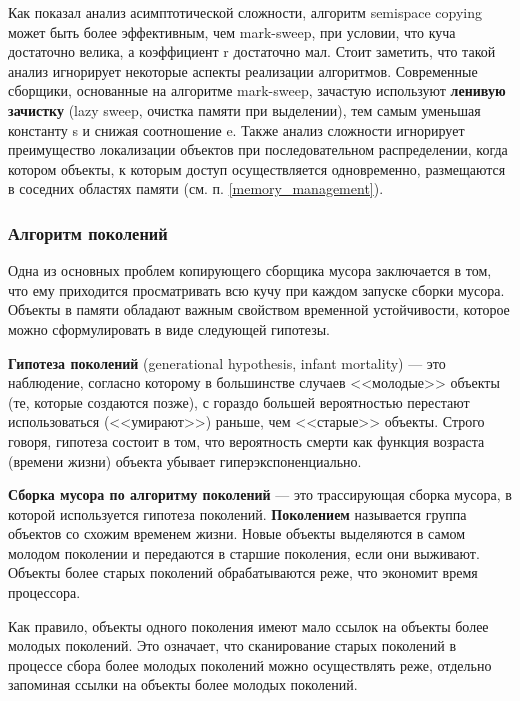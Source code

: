 Как показал анализ асимптотической сложности, алгоритм semispace copying может быть более эффективным, чем mark-sweep, при условии, что куча достаточно велика, а коэффициент r достаточно мал. Стоит заметить, что такой анализ игнорирует некоторые аспекты реализации алгоритмов. Современные сборщики, основанные на алгоритме mark-sweep, зачастую используют \textbf{ленивую зачистку} (lazy sweep, очистка памяти при выделении), тем самым уменьшая константу s и снижая соотношение e. Также анализ сложности игнорирует преимущество локализации объектов при последовательном распределении, когда котором объекты, к которым доступ осуществляется одновременно, размещаются в соседних областях памяти (см. п. \ref{memory_management}).



\subsubsection{Алгоритм поколений}

Одна из основных проблем копирующего сборщика мусора заключается в том, что ему приходится просматривать всю кучу при каждом запуске сборки мусора. Объекты в памяти обладают важным свойством временной устойчивости, которое можно сформулировать в виде следующей гипотезы. \cite{cornell3}

\textbf{Гипотеза поколений} (generational hypothesis, infant mortality) \cite{glossary} --- это наблюдение, согласно которому в большинстве случаев <<молодые>> объекты (те, которые создаются позже), с гораздо большей вероятностью перестают использоваться (<<умирают>>) раньше, чем <<старые>> объекты. Строго говоря, гипотеза состоит в том, что вероятность смерти как функция возраста (времени жизни) объекта убывает гиперэкспоненциально.

\textbf{Сборка мусора по алгоритму поколений} \cite{glossary} --- это трассирующая сборка мусора, в которой используется гипотеза поколений. \textbf{Поколением} называется группа объектов со схожим временем жизни. Новые объекты выделяются в самом молодом поколении и передаются в старшие поколения, если они выживают. Объекты более старых поколений обрабатываются реже, что экономит время процессора.

Как правило, объекты одного поколения имеют мало ссылок на объекты более молодых поколений. Это означает, что сканирование старых поколений в процессе сбора более молодых поколений можно осуществлять реже, отдельно запоминая ссылки на объекты более молодых поколений. \cite{cornell3}

